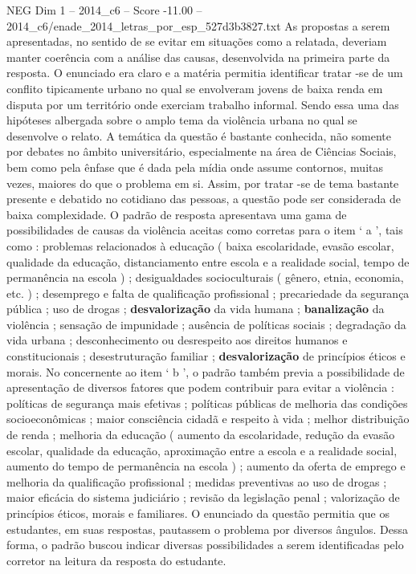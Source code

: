 \begin{textsample}{NEG Dim 1 – 2014\_c6 – Score -11.00 – 2014\_c6/enade\_2014\_letras\_por\_esp\_527d3b3827.txt}
As propostas a serem apresentadas, no sentido de se evitar em situações como a relatada, deveriam manter coerência com a análise das causas, desenvolvida na primeira parte da resposta.
O enunciado era claro e a matéria permitia identificar tratar -se de um conflito tipicamente urbano no qual se envolveram jovens de baixa renda em disputa por um território onde exerciam trabalho informal.
Sendo essa uma das hipóteses albergada sobre o amplo tema da violência urbana no qual se desenvolve o relato.
A temática da questão é bastante conhecida, não somente por debates no âmbito universitário, especialmente na área de Ciências Sociais, bem como pela ênfase que é dada pela mídia onde assume contornos, muitas vezes, maiores do que o problema em si.
Assim, por tratar -se de tema bastante presente e debatido no cotidiano das pessoas, a questão pode ser considerada de baixa complexidade.
O padrão de resposta apresentava uma gama de possibilidades de causas da violência aceitas como corretas para o item ‘ a ’, tais como : problemas relacionados à educação ( baixa escolaridade, evasão escolar, qualidade da educação, distanciamento entre escola e a realidade social, tempo de permanência na escola ) ; desigualdades socioculturais ( gênero, etnia, economia, etc. ) ; desemprego e falta de qualificação profissional ; precariedade da segurança pública ; uso de drogas ; \textbf{desvalorização} da vida humana ; \textbf{banalização} da violência ; sensação de impunidade ; ausência de políticas sociais ; degradação da vida urbana ; desconhecimento ou desrespeito aos direitos humanos e constitucionais ; desestruturação familiar ; \textbf{desvalorização} de princípios éticos e morais.
No concernente ao item ‘ b ’, o padrão também previa a possibilidade de apresentação de diversos fatores que podem contribuir para evitar a violência : políticas de segurança mais efetivas ; políticas públicas de melhoria das condições socioeconômicas ; maior consciência cidadã e respeito à vida ; melhor distribuição de renda ; melhoria da educação ( aumento da escolaridade, redução da evasão escolar, qualidade da educação, aproximação entre a escola e a realidade social, aumento do tempo de permanência na escola ) ; aumento da oferta de emprego e melhoria da qualificação profissional ; medidas preventivas ao uso de drogas ; maior eficácia do sistema judiciário ; revisão da legislação penal ; valorização de princípios éticos, morais e familiares.
O enunciado da questão permitia que os estudantes, em suas respostas, pautassem o problema por diversos ângulos.
Dessa forma, o padrão buscou indicar diversas possibilidades a serem identificadas pelo corretor na leitura da resposta do estudante.

\end{textsample}
